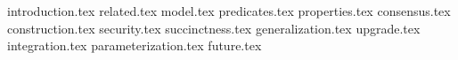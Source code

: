 {introduction.tex}
{related.tex}
{model.tex}
{predicates.tex}
{properties.tex}
{consensus.tex}
{construction.tex}
{security.tex}
{succinctness.tex}
{generalization.tex}
{upgrade.tex}
{integration.tex}
{parameterization.tex}
{future.tex}
